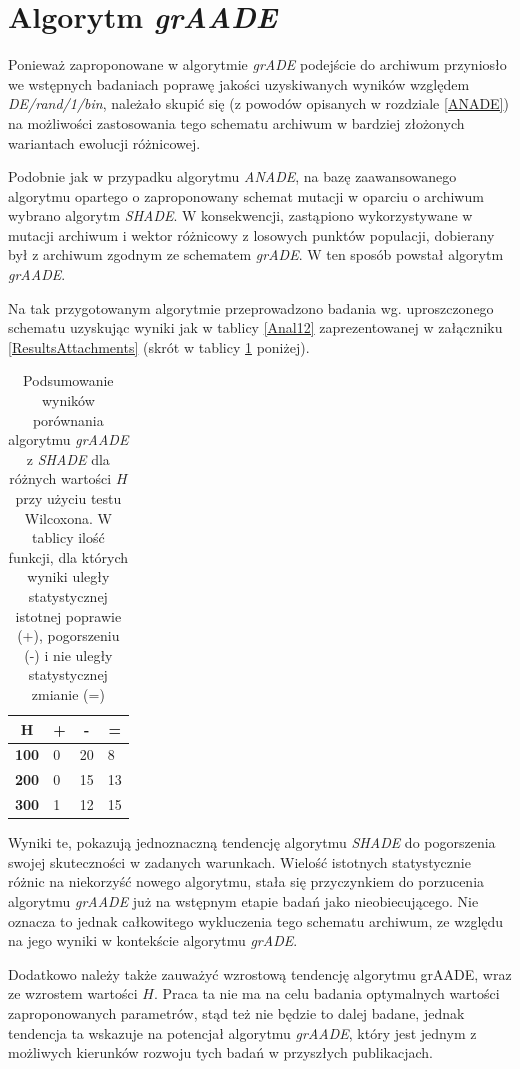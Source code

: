 \documentclass[12pt,a4paper]{report}
\begin{document}
{{{{{{{\section{Algorytm \emph{grAADE}}
\label{grAADE}
\par{
Ponieważ zaproponowane w algorytmie \emph{grADE} podejście do archiwum przyniosło we wstępnych badaniach poprawę jakości uzyskiwanych wyników względem \emph{DE/rand/1/bin}, należało skupić się (z powodów opisanych w rozdziale \ref{ANADE}) na możliwości zastosowania tego schematu archiwum w bardziej złożonych wariantach ewolucji różnicowej.
}
\par{
Podobnie jak w przypadku algorytmu \emph{ANADE}, na bazę zaawansowanego algorytmu opartego o zaproponowany schemat mutacji w oparciu o archiwum wybrano algorytm \emph{SHADE}. W konsekwencji, zastąpiono wykorzystywane w mutacji archiwum i wektor różnicowy z losowych punktów populacji, dobierany był z archiwum zgodnym ze schematem \emph{grADE}. W ten sposób powstał algorytm \emph{grAADE}.
}
\par{
Na tak przygotowanym algorytmie przeprowadzono badania wg. uproszczonego schematu uzyskując wyniki jak w tablicy \ref{Anal12} zaprezentowanej w załączniku \ref{ResultsAttachments} (skrót w tablicy \ref{Anal12sum} poniżej).
}
\begin{table}[h]
\centering
\caption{Podsumowanie wyników porównania algorytmu \emph{grAADE} z \emph{SHADE} dla różnych wartości $H$ przy użyciu testu Wilcoxona. W tablicy ilość funkcji, dla których wyniki uległy statystycznej istotnej poprawie (+), pogorszeniu (-) i nie uległy statystycznej zmianie (=)}
\label{Anal12sum}
\begin{tabular}{|l|l|l|l|}
\hline
\multicolumn{1}{|c|}{{\bf H}} & \multicolumn{1}{c|}{{\bf +}} & \multicolumn{1}{c|}{{\bf -}} & \multicolumn{1}{c|}{{\bf =}} \\ \hline
{\bf 100} & 0 & 20 & 8  \\ \hline
{\bf 200} & 0 & 15 & 13 \\ \hline
{\bf 300} & 1 & 12 & 15 \\ \hline
\end{tabular}
\end{table}

\par{
Wyniki te, pokazują jednoznaczną tendencję algorytmu \emph{SHADE} do pogorszenia swojej skuteczności w zadanych warunkach. Wielość istotnych statystycznie różnic na niekorzyść nowego algorytmu, stała się przyczynkiem do porzucenia algorytmu \emph{grAADE} już na wstępnym etapie badań jako nieobiecującego. Nie oznacza to jednak całkowitego wykluczenia tego schematu archiwum, ze względu na jego wyniki w kontekście algorytmu \emph{grADE}.
}
\par{
Dodatkowo należy także zauważyć wzrostową tendencję algorytmu grAADE, wraz ze wzrostem wartości $H$. Praca ta nie ma na celu badania optymalnych wartości zaproponowanych parametrów, stąd też nie będzie to dalej badane, jednak tendencja ta wskazuje na potencjał algorytmu \emph{grAADE}, który jest jednym z możliwych kierunków rozwoju tych badań w przyszłych publikacjach.
}

}}}}}}}
\end{document}
